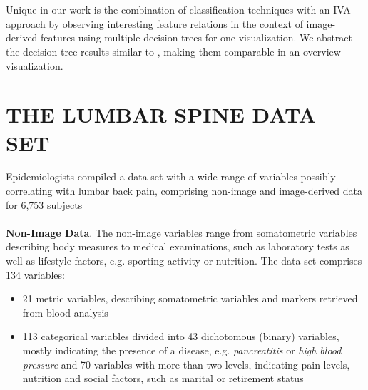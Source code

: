 \documentclass[a4paper,twoside]{style/article}
\begin{document}
\\\\
Unique in our work is the combination of classification techniques with an IVA approach by observing interesting feature relations in the context of image-derived features using multiple decision trees for one visualization.
We abstract the decision tree results similar to \cite{Turkay}, making them comparable in an overview visualization.
\section{\uppercase{The Lumbar Spine Data Set}}
\label{sec:MaterialsAndMethod}
\noindent Epidemiologists compiled a data set with a wide range of variables possibly correlating with lumbar back pain, comprising non-image and image-derived data for 6,753 subjects
\\\\
\noindent \textbf{Non-Image Data}.
The non-image variables range from somatometric variables describing body measures to medical examinations, such as laboratory tests as well as lifestyle factors, e.g. sporting activity or nutrition.
The data set comprises 134 variables: %
\begin{itemize}
	\item 21 metric variables, describing somatometric variables and markers retrieved from blood analysis
	\item 113 categorical variables divided into 43 dichotomous (binary) variables, mostly indicating the presence of a disease, e.g. \emph{pancreatitis} or \emph{high blood pressure} and 70 variables with more than two levels, indicating pain levels, nutrition and social factors, such as marital or retirement status
\end{itemize}
\end{document}
